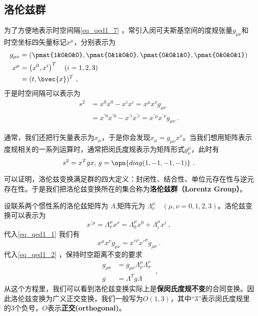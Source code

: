 \subsection{洛伦兹群}
为了方便地表示时空间隔\autoref{eq_qed1_7} ，常引入闵可夫斯基空间的度规张量$g_{\mu\nu}$和时空坐标四矢量标记$x^{\mu}$，分别表示为
\begin{equation}
\begin{aligned}
g_{\mu \nu}&=(\pmat{1&0&0&0},\pmat{0&1&0&0},\pmat{0&0&1&0},\pmat{0&0&0&1})\\
x^{\mu} &=\left(x^{0}, x^{i}\right)^T \quad(i=1,2,3)\\
&=(t, \bvec{x})^T~,
\end{aligned}
\end{equation}
于是时空间隔可以表示为
\begin{equation}\label{eq_qed1_1}\begin{aligned}
s^{2} &=x^{0} x^{0}-x^{i} x^{i}=x^{\mu} x^{\nu} g_{\mu \nu} \\
&=x^{\prime 0} x^{\prime 0}-x^{\prime i} x^{\prime i}=x^{\prime \mu} x^{\prime \nu} g_{\mu \nu}~.\end{aligned}\end{equation}

通常，我们还把行矢量表示为$x_{\mu}$，于是你会发现$x_{\mu}=g_{\mu\nu}x^{\nu}$。当我们想用矩阵表示度规相关的一系列运算时，通常把闵氏度规表示为矩阵形式$g^{\mu}_{\nu}$，此时有
\begin{equation}
s^2=x^Tgx,\,g=\opn{diag(1,-1,-1,-1)}~.
\end{equation}



可以证明，洛伦兹变换满足群的四大定义：封闭性、结合性、单位元存在性与逆元存在性。于是我们把洛伦兹变换所在的集合称为\textbf{洛伦兹群（Lorentz Group）}。



设联系两个惯性系的洛伦兹矩阵为 $\Lambda$,矩阵元为 $\Lambda_{\nu}^{\mu}\quad(\mu,\nu=0,1,2,3)$。洛伦兹变换可以表示为
\begin{equation}\label{eq_qed1_2}x^{\prime \mu}=\Lambda_{\nu}^{\mu} x^{\nu}=\Lambda_{0}^{\mu} x^{0}+\Lambda_{i}^{\mu} x^{i}~,\end{equation}
代入\autoref{eq_qed1_1} 我们有
\begin{equation}
x^{\mu} x^{\nu} g_{\mu \nu}=x'^{\rho} x'^{\sigma} g_{\rho \sigma}~.
\end{equation}
代入\autoref{eq_qed1_2} ，保持时空距离不变的要求
\begin{equation}\label{eq_qed1_3}
\begin{aligned}
g_{\rho \sigma}&=g_{\mu \nu} \Lambda_{\rho}^{\mu} \Lambda_{\sigma}^{\nu}\\
g&=\Lambda^Tg\Lambda
\end{aligned}~,
\end{equation}
从这个方程里，我们可以看到洛伦兹变换实际上是\textbf{保闵氏度规不变}的合同变换。因此洛伦兹变换为广义正交变换，我们一般写为$O(1,3)$，其中“3”表示闵氏度规里的3个负号，$O$表示\textbf{正交(orthogonal)}。



